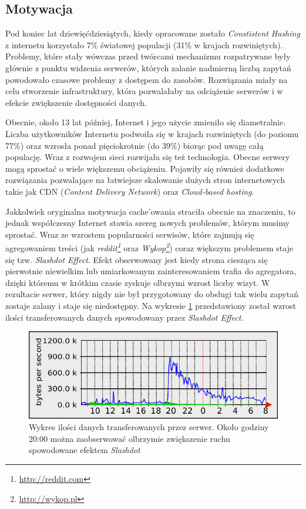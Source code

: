 \documentclass[a4paper,11pt]{scrartcl}
\newcommand{\s}{ }
\newcommand{\keszowania}{cache'owania}
\begin{document}
\subsection{Motywacja}
Pod koniec lat dziewięćdziesiątych, kiedy opracowane zostało \textit{Constistent Hashing} z internetu korzystało 7\% światowej populacji (31\% w krajach rozwiniętych)\cite{wiki:GlobalStats}. Problemy, które stały wówczas przed twórcami mechanizmu rozpatrywane były głównie z punktu widzenia serwerów, których zalanie nadmierną liczbą zapytań powodowało czasowe problemy z dostępem do zasobów. Rozwiązania miały na celu stworzenie infrastruktury, która pozwalałaby na odciążenie serwerów i w efekcie zwiększenie dostępności danych.

Obecnie, około 13 lat później, Internet i jego użycie zmieniło się diametralnie. Liczba użytkowników Internetu podwoiła się w krajach rozwiniętych (do poziomu 77\%) oraz wzrosła ponad pięciokrotnie (do 39\%) biorąc pod uwagę całą populację\cite{wiki:GlobalStats}. Wraz z rozwojem sieci rozwijała się też technologia. Obecne serwery mogą sprostać o wiele większemu obciążeniu. Pojawiły się również dodatkowe rozwiązania pozwalające na łatwiejsze skalowanie dużych stron internetowych takie jak CDN (\textit{Content Delivery Network}) oraz \textit{Cloud-based hosting}.

Jakkolwiek oryginalna motywacja \keszowania\s straciła obecnie na znaczeniu, to jednak współczesny Internet stawia szereg nowych problemów, którym musimy sprostać. Wraz ze wzrostem popularności serwisów, które zajmują się agregowaniem treści (jak \textit{reddit\footnote{\url{http://reddit.com}}} oraz \textit{Wykop\footnote{\url{http://wykop.pl}}}) coraz większym problemem staje się tzw. \textit{Slashdot Effect}. Efekt obserwowany jest kiedy strona ciesząca się pierwotnie niewielkim lub umiarkowanym zainteresowaniem trafia do agregatora, dzięki któremu w krótkim czasie zyskuje olbrzymi wzrost liczby wizyt. W rezultacie serwer, który nigdy nie był przygotowany do obsługi tak wielu zapytań zostaje zalany i staje się niedostępny. Na wykresie \ref{fig_slashdot} przedstawiony został wzrost ilości transferowanych danych spowodowany przez \textit{Slashdot Effect}.

\begin{figure}[h!]
\centering
\includegraphics[width=0.9\linewidth]{img/SlashdotEffectGraph.pdf}
\caption{Wykres ilości danych transferowanych przez serwer. Około godziny 20:00 można zaobserwować olbrzymie zwiększenie ruchu spowodowane efektem \textit{Slashdot}}
\label{fig_slashdot}
\end{figure}
\end{document}
